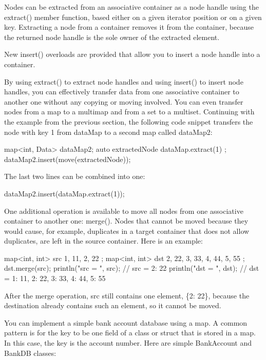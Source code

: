 Nodes can be extracted from an associative container as a node handle using the extract() member function, based either on a given iterator position or on a given key. Extracting a node from a container removes it from the container, because the returned node handle is the sole owner of the extracted element.

New insert() overloads are provided that allow you to insert a node handle into a container.

By using extract() to extract node handles and using insert() to insert node handles, you can effectively transfer data from one associative container to another one without any copying or moving involved. You can even transfer nodes from a map to a multimap and from a set to a multiset. Continuing with the example from the previous section, the following code snippet transfers the node with key 1 from dataMap to a second map called dataMap2:

\begin{cpp}
map<int, Data> dataMap2;
auto extractedNode { dataMap.extract(1) };
dataMap2.insert(move(extractedNode));
\end{cpp}

The last two lines can be combined into one:

\begin{cpp}
dataMap2.insert(dataMap.extract(1));
\end{cpp}

One additional operation is available to move all nodes from one associative container to another one: merge(). Nodes that cannot be moved because they would cause, for example, duplicates in a target container that does not allow duplicates, are left in the source container. Here is an example:

\begin{cpp}
map<int, int> src { {1, 11}, {2, 22} };
map<int, int> dst { {2, 22}, {3, 33}, {4, 44}, {5, 55} };
dst.merge(src);
println("src = {}", src); // src = {2: 22}
println("dst = {}", dst); // dst = {1: 11, 2: 22, 3: 33, 4: 44, 5: 55}
\end{cpp}

After the merge operation, src still contains one element, \{2: 22\}, because the destination already contains such an element, so it cannot be moved.


You can implement a simple bank account database using a map. A common pattern is for the key to be one field of a class or struct that is stored in a map. In this case, the key is the account number. Here are simple BankAccount and BankDB classes:

